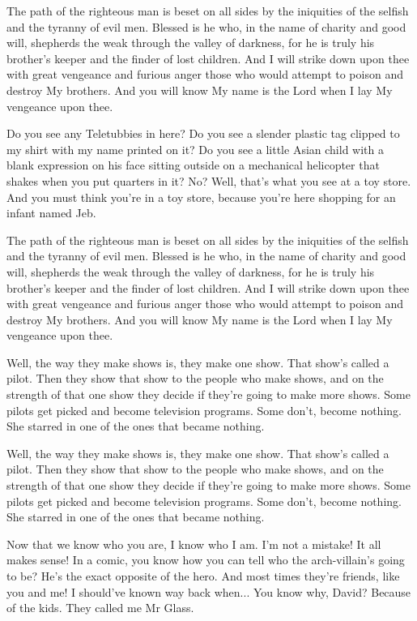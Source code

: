 \documentclass{book}
\begin{document}
The path of the righteous man is beset on all sides by the iniquities of the selfish and the tyranny of evil men. Blessed is he who, in the name of charity and good will, shepherds the weak through the valley of darkness, for he is truly his brother's keeper and the finder of lost children. And I will strike down upon thee with great vengeance and furious anger those who would attempt to poison and destroy My brothers. And you will know My name is the Lord when I lay My vengeance upon thee.

Do you see any Teletubbies in here? Do you see a slender plastic tag clipped to my shirt with my name printed on it? Do you see a little Asian child with a blank expression on his face sitting outside on a mechanical helicopter that shakes when you put quarters in it? No? Well, that's what you see at a toy store. And you must think you're in a toy store, because you're here shopping for an infant named Jeb.

The path of the righteous man is beset on all sides by the iniquities of the selfish and the tyranny of evil men. Blessed is he who, in the name of charity and good will, shepherds the weak through the valley of darkness, for he is truly his brother's keeper and the finder of lost children. And I will strike down upon thee with great vengeance and furious anger those who would attempt to poison and destroy My brothers. And you will know My name is the Lord when I lay My vengeance upon thee.

Well, the way they make shows is, they make one show. That show's called a pilot. Then they show that show to the people who make shows, and on the strength of that one show they decide if they're going to make more shows. Some pilots get picked and become television programs. Some don't, become nothing. She starred in one of the ones that became nothing.

Well, the way they make shows is, they make one show. That show's called a pilot. Then they show that show to the people who make shows, and on the strength of that one show they decide if they're going to make more shows. Some pilots get picked and become television programs. Some don't, become nothing. She starred in one of the ones that became nothing.

Now that we know who you are, I know who I am. I'm not a mistake! It all makes sense! In a comic, you know how you can tell who the arch-villain's going to be? He's the exact opposite of the hero. And most times they're friends, like you and me! I should've known way back when... You know why, David? Because of the kids. They called me Mr Glass.
\end{document}
